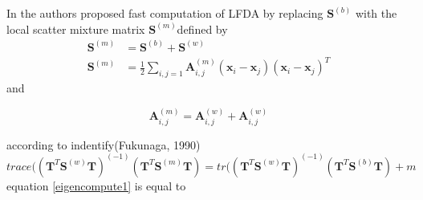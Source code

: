 In \cite{KLFDA} the authors proposed fast computation of LFDA by replacing $\bm{S}^{(b)}$ with the local scatter mixture matrix $\bm{S}^{(m)}$defined by 
\begin{equation}
\begin{aligned}
\bm{S}^{(m)} &= \bm{S}^{(b)} + \bm{S}^{(w)}\\
\bm{S}^{(m)} &= \frac{1}{2} \sum_{i,j = 1} \bm{A}_{i,j}^{(m)} (\bm{x}_i - \bm{x}_j)(\bm{x}_i - \bm{x}_j)^T
\end{aligned}
\end{equation}
and 

\begin{equation}
\bm{A}_{i,j}^{(m)} = \bm{A}_{i,j}^{(w)}  + \bm{A}_{i,j}^{(w)}
\end{equation}

\noindent according to indentify(Fukunaga, 1990)
\begin{equation}
trace((\bm{T}^T\bm{S}^{(w)}\bm{T})^{(-1)}(\bm{T}^T\bm{S}^{(m)}\bm{T}) = tr((\bm{T}^T\bm{S}^{(w)}\bm{T})^{(-1)}(\bm{T}^T\bm{S}^{(b)}\bm{T}) + m
\end{equation}
equation \ref{eigencompute1} is equal to 

